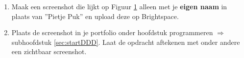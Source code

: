 \begin{enumerate} [label=\alph*]
\begin{enumerate} [label=\roman*]
\begin{figure}[h!]
		 	\centering
		 	\caption{Weergave van drie objecten van de klasse Led.}
		 	\label{fig:dddLeds}
		 \end{figure}
\end{enumerate}
	 \item Maak een screenshot die lijkt op Figuur \ref{fig:dddLeds} alleen met je \textbf{eigen naam} in plaats van ''Pietje Puk'' en upload deze op Brightspace.
	 \item Plaats de screenshot in je portfolio onder hoofdstuk programmeren $\Longrightarrow$ subhoofdstuk \ref{sec:startDDD}. Laat de opdracht aftekenen met onder andere een zichtbaar screenshot.
 
\end{enumerate}


